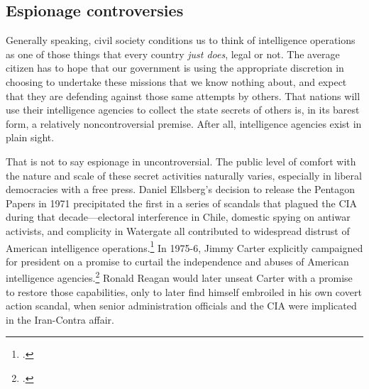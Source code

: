 \documentclass[11pt]{memoir}
\begin{document}
\begin{refsegment}

\subsection{Espionage controversies}
Generally speaking, civil society conditions us to think of intelligence operations as one of those things that every country \emph{just does}, legal or not. The average citizen has to hope that our government is using the appropriate discretion in choosing to undertake these missions that we know nothing about, and expect that they are defending against those same attempts by others. That nations will use their intelligence agencies to collect the state secrets of others is, in its barest form, a relatively noncontroversial premise. After all, intelligence agencies exist in plain sight.

That is not to say espionage in uncontroversial. The public level of comfort with the nature and scale of these secret activities naturally varies, especially in liberal democracies with a free press. Daniel Ellsberg's decision to release the Pentagon Papers in 1971 precipitated the first in a series of scandals that plagued the CIA during that decade---electoral interference in Chile, domestic spying on antiwar activists, and complicity in Watergate all contributed to widespread distrust of American intelligence operations.\footcite[p.~214-215]{andrew_missing_1984} In 1975-6, Jimmy Carter explicitly campaigned for president on a promise to curtail the independence and abuses of American intelligence agencies.\footcite[p.~217]{andrew_missing_1984} Ronald Reagan would later unseat Carter with a promise to restore those capabilities, only to later find himself embroiled in his own covert action scandal, when senior administration officials and the CIA were implicated in the Iran-Contra affair.


\end{refsegment}
\end{document}
